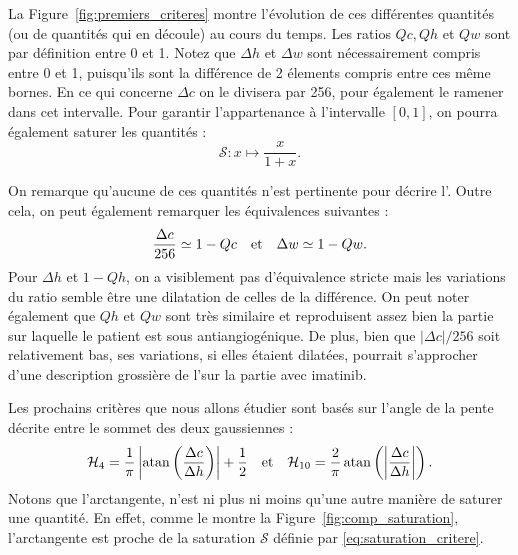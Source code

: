 \documentclass[main.tex]{subfiles}
\begin{document}
La Figure~\ref{fig:premiers_criteres} montre l'évolution de ces différentes quantités (ou de quantités qui en découle) au cours du temps. 
Les ratios $Qc, Qh$ et $Qw$ sont par définition entre 0 et 1. 
Notez que $\Delta h$ et $\Delta w$ sont nécessairement compris entre 0 et 1, puisqu'ils sont la différence de 2 élements compris entre ces même bornes. En ce qui concerne $\Delta c$ on le divisera par 256, pour également le ramener dans cet intervalle. Pour garantir l'appartenance à l'intervalle $[0,1]$, on pourra également saturer les quantités :
\begin{equation}
\label{eq:saturation_critere}
\mathscr{S}: x \longmapsto \dfrac{x}{1+x}.
\end{equation}

On remarque qu'aucune de ces quantités n'est pertinente pour décrire l'\hetero. Outre cela, on peut également remarquer les équivalences suivantes :
\begin{equation}
\label{eq:equiv_diff_rapport}
\dfrac{\Delta c}{256} \simeq 1 - Qc \quad {\rm et } \quad \Delta w \simeq 1 - Qw.
\end{equation}
Pour $\Delta h$ et $1-Qh$, on a visiblement pas d'équivalence stricte mais les variations du ratio semble être une dilatation de celles de la différence.
On peut noter également que $Qh$ et $Qw$ sont très similaire et reproduisent assez bien la partie sur laquelle le patient est sous antiangiogénique. De plus, bien que $| \Delta c | / 256$ soit relativement bas, ses variations, si elles étaient dilatées,  pourrait s'approcher d'une description grossière de l'\hetero sur la partie avec imatinib.

Les prochains critères que nous allons étudier sont basés sur l'angle de la pente 
décrite entre le sommet des deux gaussiennes :
\begin{equation}
\label{eq:critere_pente}
\mathcal{H}_4 = \dfrac{1}{\pi} \left| \operatorname{atan} \left( \dfrac{ \Delta c }{ \Delta h }  \right) \right| + \dfrac{1}{2}
\quad {\rm et } \quad
\mathcal{H}_{10} = \dfrac{2}{\pi} \operatorname{atan} \left( \left| \dfrac{ \Delta c }{ \Delta h } \right| \right).
\end{equation}
Notons que l'arctangente, n'est ni plus ni moins qu'une autre manière de saturer une quantité. En effet, comme le montre la Figure~\ref{fig:comp_saturation}, l'arctangente est proche de la saturation $\mathscr{S}$ définie par \eqref{eq:saturation_critere}.
\end{document}
